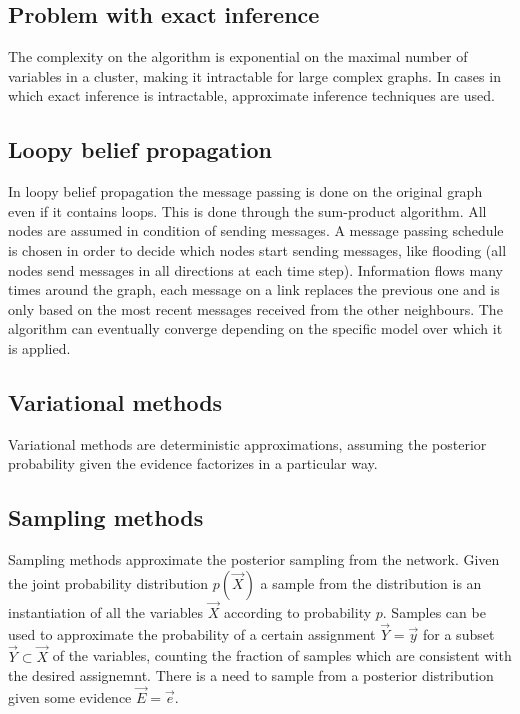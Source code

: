 	\subsection{Problem with exact inference}
	The complexity on the algorithm is exponential on the maximal number of variables in a cluster, making it intractable for large complex graphs.
	In cases in which exact inference is intractable, approximate inference techniques are used.

	\subsection{Loopy belief propagation}
	In loopy belief propagation the message passing is done on the original graph even if it contains loops.
	This is done through the sum-product algorithm.
	All nodes are assumed in condition of sending messages.
	A message passing schedule is chosen in order to decide which nodes start sending messages, like flooding (all nodes send messages in all directions at each time step).
	Information flows many times around the graph, each message on a link replaces the previous one and is only based on the most recent messages received from the other neighbours.
	The algorithm can eventually converge depending on the specific model over which it is applied.

	\subsection{Variational methods}
	Variational methods are deterministic approximations, assuming the posterior probability given the evidence factorizes in a particular way.

	\subsection{Sampling methods}
	Sampling methods approximate the posterior sampling from the network.
	Given the joint probability distribution $p(\vec{X})$ a sample from the distribution is an instantiation of all the variables $\vec{X}$ according to probability $p$.
	Samples can be used to approximate the probability of a certain assignment $\vec{Y} = \vec{y}$ for a subset $\vec{Y}\subset\vec{X}$ of the variables, counting the fraction of samples which are consistent with the desired assignemnt.
	There is a need to sample from a posterior distribution given some evidence $\vec{E} = \vec{e}$.

